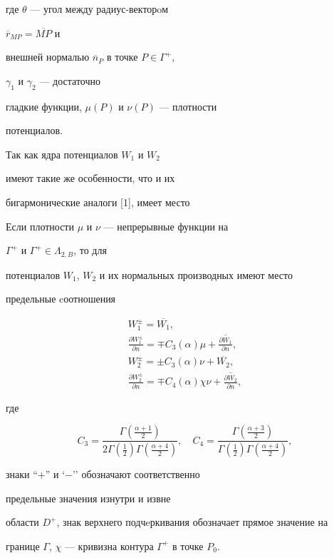 где $\theta$ --- угол между радиус-векторoм


$\overline{r}_{MP}=\overline{MP}$ и


внешней нормалью $\overline{n}_{P}$ в точке $P\in\Gamma^{+}$,


$\gamma_{1}$ и $\gamma_{2}$ --- достаточно 


гладкие функции, $\mu(P)$ и $\nu(P)$ --- плотности


потенциалов.





Так как ядра потенциалов $W_{1}$ и $W_{2}$ 


имеют такие же особенности, что и их


бигармонические аналоги [1], имеет место





\begin{thm}


Если плотности $\mu$ и $\nu$ --- непрерывные функции на 


$\Gamma^{+}$ и $\Gamma^{+}\in\Lambda_{2,B}$, то для 


потенциалов $W_{1}$, $W_{2}$ и их нормальных производных имеют место 


предельные cоотношения


\begin{gather}


W_{1}^{\pm}=\overline{W_{1}}, \\


\frac{\partial W_{1}^{\pm}}{\partial n}=\mp C_{3}(\alpha)\mu+\overline


{\frac{\partial W_{1}}{\partial n}}, \\


W_{2}^{\pm}=\pm C_{3}(\alpha)\nu+\overline{W_{2}}, \\


\frac{\partial W_{2}^{\pm}}{\partial n}=\mp C_{4}(\alpha)\chi\nu+


\overline{\frac{\partial W_{2}}{\partial n}},


\end{gather}


где 


$$


C_{3}=\frac{\Gamma(\frac{\alpha+1}{2})}


{2\Gamma(\frac{1}{2})\Gamma(\frac{\alpha+4}{2})},


\quad C_{4}=\frac{\Gamma(\frac{\alpha+3}{2})}


{\Gamma(\frac{1}{2})\Gamma(\frac{\alpha+4}{2})},


$$


знаки ``$+$'' и `$-$'' обозначают соответственно 


предельные значения изнутри и извне 


области $D^{+}$, знак верхнего подчeркивания обозначает прямое значение на 


границе $\Gamma$, $\chi$ --- кривизна контура $\Gamma^{+}$ в точке $P_{0}$.


\end{thm}








